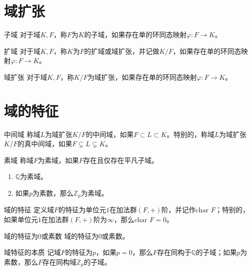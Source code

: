 \documentclass[lang = cn, scheme = chinese, thmcnt = section]{elegantbook}
\newcommand{\Q}{\mathbb{Q}}            %
\newcommand{\Z}{\mathbb{Z}}            %
\newcommand{\sub}{\subset}             %
\newcommand{\Char}{\text{char }}            %
\begin{document}
\section{域扩张}

\begin{definition}{子域}
	对于域$K,F$，称$F$为$K$的子域，如果存在单的环同态映射$\varphi:F\to K$。
\end{definition}

\begin{definition}{扩域}
	对于域$K,F$，称$K$为$F$的扩域或域扩张，并记做$K/F$，如果存在单的环同态映射$\varphi:F\to K$。
\end{definition}

\begin{definition}{域扩张}
	对于域$K,F$，称$K/F$为域扩张，如果存在单的环同态映射$\varphi:F\to K$。
\end{definition}

\section{域的特征}

\begin{definition}{中间域}
	称域$L$为域扩张$K/F$的中间域，如果$F\sub L\sub K$。特别的，称域$L$为域扩张$K/F$的真中间域，如果$F\subsetneq L\subsetneq K$。
\end{definition}

\begin{definition}{素域}
	称域$F$为素域，如果$F$存在且仅存在平凡子域。
\end{definition}

\begin{example}
	\begin{enumerate}
		\item $\Q$为素域。
		\item 如果$p$为素数，那么$\Z_p$为素域。
	\end{enumerate}
\end{example}

\begin{definition}{域的特征}
	定义域$F$的特征为单位元$1$在加法群$(F,+)$阶，并记作$\Char F$；特别的，如果单位元$1$在加法群$(F,+)$阶为$\infty$，那么$\Char F=0$。
\end{definition}

\begin{definition}{域的特征为$0$或素数}
	域的特征为$0$或素数。
\end{definition}

\begin{theorem}{域特征的本质}
	记域$F$的特征为$p$，如果$p=0$，那么$F$存在同构于$\Q$的子域；如果$p$为素数，那么$F$存在同构域$\Z_p$的子域。
\end{theorem}
\end{document}

